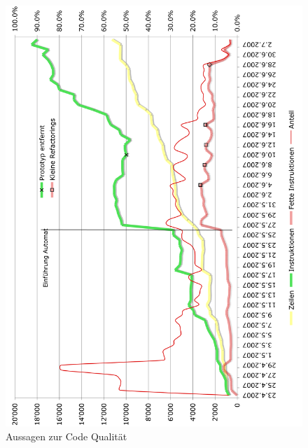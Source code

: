 \documentclass[12pt,halfparskip]{scrartcl}
\begin{document}
\begin{figure}[h]
	\centering
	\includegraphics[width=0.8 \textwidth]{code_qualitaet}
	\caption{Aussagen zur Code Qualität}
	\label{fig:code_qualitaet}
\end{figure}
\end{document}
